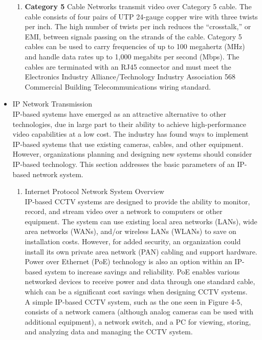 \documentclass[12pt,fleqn]{book} %
\begin{document}
\begin{itemize}
\begin{enumerate}
        \item \textbf{Category 5} Cable Networks transmit video over Category 5 cable. The cable consists of four pairs of UTP 24-gauge copper wire with three twists per inch. The high number of twists per inch reduces the “crosstalk,” or EMI, between signals passing on the strands of the cable. Category 5 cables can be used to carry frequencies of up to 100 megahertz (MHz) and handle data rates up to 1,000 megabits per second (Mbps). The cables are terminated with an RJ45 connector and must meet the Electronics Industry Alliance/Technology Industry Association 568 Commercial Building Telecommunications wiring standard.

    \end{enumerate}
    
    \item IP Network Transmission
    \\ IP-based systems have emerged as an attractive alternative to other technologies, due in large part to their ability to achieve high-performance video capabilities at a low cost. The industry has found ways to implement IP-based systems that use existing cameras, cables, and other equipment. However, organizations planning and designing new systems should consider IP-based technology. This section addresses the basic parameters of an IP-based network system. 
    \begin{enumerate}
        \item Internet Protocol Network System Overview
        \\ IP-based CCTV systems are designed to provide the ability to monitor, record, and stream video over a network to computers or other equipment. The system can use existing local area networks (LANs), wide area networks (WANs), and/or wireless LANs (WLANs) to save on installation costs. However, for added security, an organization could install its own private area network (PAN) cabling and support hardware. Power over Ethernet (PoE) technology is also an option within an IP-based system to increase savings and reliability. PoE enables various networked devices to receive power and data through one standard cable, which can be a significant cost savings when designing CCTV systems. 
        \\A simple IP-based CCTV system, such as the one seen in Figure 4-5, consists of a network camera (although analog cameras can be used with additional equipment), a network switch, and a PC for viewing, storing, and analyzing data and managing the CCTV system.

\end{enumerate}
\end{itemize}
\end{document}
